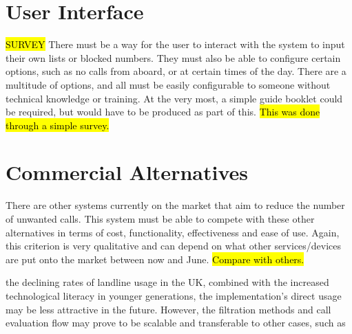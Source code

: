 \documentclass[main.tex]{subfiles}
\begin{document}
\section{User Interface}
\hl{SURVEY}
There must be a way for the user to interact with the system to input their own lists or blocked numbers. They must also be able to configure certain options, such as no calls from aboard, or at certain times of the day. There are a multitude of options, and all must be easily configurable to someone without technical knowledge or training. At the very most, a simple guide booklet could be required, but would have to be produced as part of this. \hl{This was done through a simple survey.}

\section{Commercial Alternatives}
There are other systems currently on the market that aim to reduce the number of unwanted calls. This system must be able to compete with these other alternatives in terms of cost, functionality, effectiveness and ease of use. Again, this criterion is very qualitative and can depend on what other services/devices are put onto the market between now and June. \hl{Compare with others.}


the declining rates of landline usage in the UK, combined with the increased technological literacy in younger generations, the implementation’s direct usage may be less attractive in the future. However, the filtration methods and call evaluation flow may prove to be scalable and transferable to other cases, such as
\end{document}
